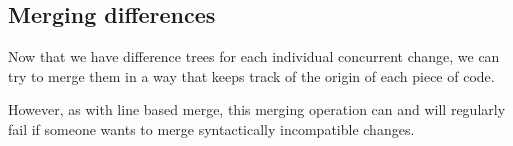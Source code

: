 \documentclass[a4paper,10pt]{article}
\begin{document}
\begin{prooftree}
\end{prooftree}

\begin{prooftree}
\end{prooftree}

\begin{prooftree}
\end{prooftree}

\begin{prooftree}
\end{prooftree}

\begin{prooftree}
\end{prooftree}

\begin{prooftree}
\end{prooftree}

\begin{prooftree}
\end{prooftree}

\subsection{Merging differences}
Now that we have difference trees for each individual concurrent change, we can try to merge them in a way that keeps track of the origin of each piece of code.

However, as with line based merge, this merging operation can and will regularly fail if someone wants to merge syntactically incompatible changes.
\end{document}
